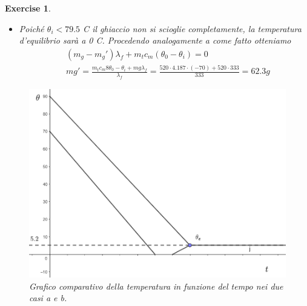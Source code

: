 \documentclass[10pt,a4paper]{article}
\newtheorem{exercise}{Exercise}
\begin{document}
\begin{exercise}
\begin{itemize}
\begin{align*}
\end{align*} 
dove i termini sono rispettivamente: il calore necessario per raffreddare l'acqua da $\theta_i$ a $\theta_e$ (< 0 perché si raffredda), il calore necessario per far squagliare il ghiaccio e il calore necessario per portare a $\theta_e$ il ghiaccio sciolto (inizialmente a temperatura $\theta_0$).
\item[b.] Poiché $\theta_i<79.5$ \textdegree C il ghiaccio non si scioglie completamente, la temperatura d'equilibrio sarà a 0 \textdegree C. Procedendo analogamente a come fatto otteniamo
\begin{align*} 
	&(m_g-m_g') \lambda_f +m_t c_m (\theta_0-\theta_i) = 0\\
	&mg' = \frac{m_t c_m 8\theta_0-\theta_i+mg\lambda_f}{\lambda_f} = \frac{520\cdot 4.187 \cdot(-70)+520\cdot 333}{333} = 62.3 g
\end{align*} 
\end{itemize}
\begin{figure}[h!]
	\centering
	\includegraphics[width=0.6\linewidth]{../images/te_ghiaccio}
	\caption{Grafico comparativo della temperatura in funzione del tempo nei due casi a e b.}
	\label{fig:teghiaccio}
\end{figure}
\FloatBarrier
\end{exercise}
\end{document}
